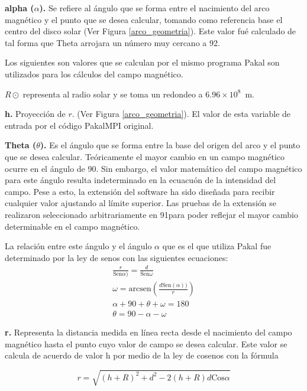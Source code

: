 \textbf{alpha ($\alpha$).} Se refiere al \'angulo que se forma entre el nacimiento del arco magn\'etico y el punto que se desea calcular, tomando como referencia base el centro del disco solar (Ver Figura \ref{arco_geometria}). Este valor fu\'e calculado de tal forma que Theta arrojara un n\'umero muy cercano a 92\degree.

Los siguientes son valores que se calculan por el mismo programa Pakal son utilizados para los c\'alculos del campo magn\'etico.


\textbf{\(R\odot\)}  representa al radio solar y se toma un redondeo a $6.96\times 10^8$~m.

\textbf{h.} Proyecci\'on de $r$.
(Ver Figura \ref{arco_geometria}). El valor de esta variable de entrada por el c\'odigo PakalMPI original.

\textbf{Theta ($\theta$). }Es el \'angulo que se forma entre la base del origen del arco y el punto que se desea calcular. Te\'oricamente el mayor cambio en un campo magn\'etico ocurre en el \'angulo de 90\degree. Sin embargo, el valor matem\'atico del campo magn\'etico para este \'angulo resulta indeterminado en la ecuacu\'on de la intensidad del campo. Pese a esto, la extensi\'on del software ha sido diseñada para recibir cualquier valor ajustando al l\'imite superior.
Las pruebas de la extensi\'on se realizaron seleccionado arbitrariamente en 91\degree para poder reflejar el mayor cambio determinable en el campo magn\'etico.

La relaci\'on entre este \'angulo y el \'angulo $\alpha$ que es el que utiliza Pakal fue determinado por la ley de senos con las siguientes ecuaciones:
\begin{gather*} \label{theta_equation}
\frac{r}{\mbox{Sen}\alpha)} = \frac{d}{\mbox{Sen}\omega} \\
\omega = \mbox{arcsen}\left(\frac{d\mbox{Sen}(\alpha))}{r}\right) \\
\alpha + 90 + \theta + \omega = 180 \\
\theta = 90 - \alpha - \omega
\end{gather*}

\textbf{r. }Representa la distancia medida en l\'inea recta desde el nacimiento del campo magn\'etico hasta el punto cuyo valor de campo se desea calcular. Este valor se calcula de acuerdo de valor h por medio de la ley de cosenos con la f\'ormula
 
\begin{equation*} \label{r_equation}
r = \sqrt{ (h+R)^2 + d^2 - 2(h+R)d\mbox{Cos}\alpha  }
\end{equation*}

